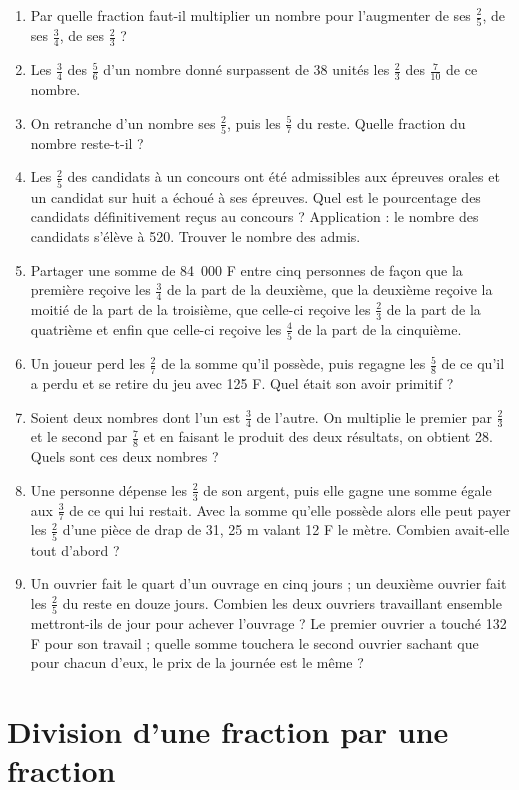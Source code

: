 \documentclass[12 pt]{report}
\theoremstyle{plain}
\newcounter{n}
\begin{document}
\begin{enumerate}
  \item Par quelle fraction faut-il multiplier un nombre pour l'augmenter de ses $\frac25$, de ses $\frac34$, de ses $\frac23$ ? 
  \item Les $\frac34$ des $\frac56$ d'un nombre donné surpassent de 38 unités les $\frac23$ des $\frac7{10}$ de ce nombre. 
  \item On retranche d'un nombre ses $\frac25$,
  puis les $\frac57$ du reste. Quelle fraction du nombre reste-t-il ? 
  \item Les $\frac25$ des candidats à un concours ont été admissibles aux épreuves orales et un candidat sur huit a échoué à ses épreuves. Quel est le pourcentage 
  des candidats définitivement reçus au concours ? 
  Application : le nombre des candidats s'élève à 520. Trouver le nombre des admis.
  \item Partager une somme de 84~000 F entre cinq personnes de façon que la première reçoive les $\frac34$ de la part de la deuxième, 
  que la deuxième reçoive la moitié de la part de la troisième, 
  que celle-ci reçoive les $\frac23$ de la part de la quatrième et enfin que celle-ci reçoive les $\frac45$
  de la part de la cinquième. 
  \item Un joueur perd les $\frac27$ de la somme qu'il 
  possède, puis regagne les $\frac58$ de ce qu'il a perdu et se retire du jeu avec 125 F. Quel était son avoir primitif ? 
  \item Soient deux nombres dont l'un est $\frac34$ de 
  l'autre. On multiplie le premier par $\frac23$ et le second par $\frac78$ et en faisant le produit des deux résultats, on obtient 28. Quels sont ces deux nombres ? 
  \item Une personne dépense les $\frac23$ de son argent, puis elle gagne une somme égale aux $\frac37$
  de ce qui lui restait. Avec la somme qu'elle possède alors elle peut payer les $\frac25$ d'une pièce de drap de 31, 25 m valant 12 F le mètre. Combien avait-elle tout d'abord ? 
  \item Un ouvrier fait le quart d'un ouvrage en cinq jours ; un deuxième ouvrier fait les $\frac25$ du reste en douze jours. Combien les deux ouvriers travaillant ensemble mettront-ils de jour pour achever l'ouvrage ? Le premier ouvrier a touché 132 F pour son travail ; quelle somme touchera le second ouvrier sachant que pour chacun d'eux, le prix de la journée est le même ? 
 \end{enumerate}

 
 \chapter{Division d'une fraction par une fraction}
 
\end{document}

